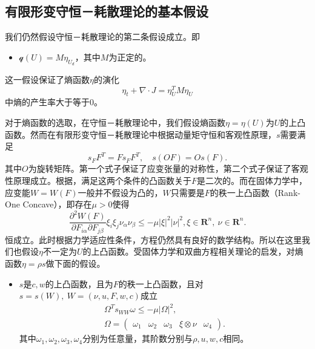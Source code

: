 \subsection{有限形变守恒－耗散理论的基本假设}
我们仍然假设守恒－耗散理论的第二条假设成立。即
\begin{itemize}
	\item $\mathcal{q}(U) = M \eta_{U_d}$，其中$M$为正定的。
\end{itemize}
这一假设保证了熵函数$\eta$的演化
\begin{equation}\label{eq:entropypro}
	\eta_t + \nabla \cdot J = \eta_U^T M \eta_U
\end{equation}
中熵的产生率大于等于$0$。

对于熵函数的选取，在守恒－耗散理论中，我们假设熵函数$\eta=\eta(U)$为$U$的上凸函数。然而在有限形变守恒－耗散理论中根据动量矩守恒和客观性原理，$s$需要满足
\begin{equation}\label{eq:sObjective}
	s_F F^T = F s_F F^T, \quad s(OF) = O s(F).
\end{equation}
其中$O$为旋转矩阵\cite{dafermos2013non}。第一个式子保证了应变张量的对称性，第二个式子保证了客观性原理成立。根据\cite{ball1976convexity}，满足这两个条件的凸函数关于$F$是二次的。而在固体力学中，应变能$W=W(F)$一般并不假设为凸的，$W$只需要是$F$的秩一上凸函数（Rank-One Concave），即存在$\mu>0$使得
\begin{equation*}
	\frac{\partial^2 W(F)}{\partial F_{i\alpha} \partial F_{j\beta}} \xi_i \xi_j \nu_\alpha \nu_\beta \le -\mu |\xi|^2 |\nu|^2, \xi \in \mathbf{R}^n, \ \nu \in \mathbf{R}^n. 
\end{equation*}
恒成立。此时根据力学适应性条件，方程仍然具有良好的数学结构。所以在这里我们也假设$\eta$不一定为$U$的上凸函数。受固体力学和双曲方程相关理论的启发，对熵函数$\eta = \rho s$做下面的假设。
\begin{itemize}
	\item $s$是$c,w$的上凸函数，且为$F$的秩一上凸函数，且对$s=s(W),\ W= (\nu,u,F,w,c)$成立
\begin{eqnarray}
	\Omega^T s_{WW} \omega \le -\mu |\Omega|^2, \label{eq:FCDFconvex}\\ 
	\Omega = \left( \begin{array}{cccccc}
		\omega_1 & \omega_2 & \omega_3 & \xi \otimes \nu & \omega_4
	\end{array}\right). \nonumber
\end{eqnarray}
其中$\omega_1,\omega_2,\omega_3,\omega_4$分别为任意量，其阶数分别与$\rho, u, w,c$相同。
\end{itemize}

